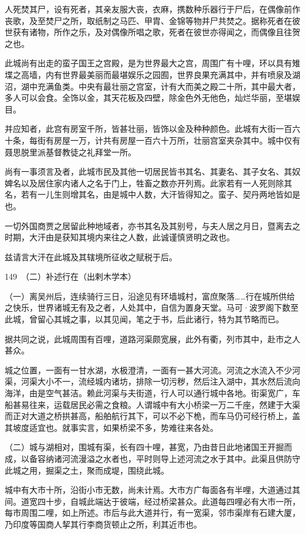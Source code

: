 \documentclass[12pt,UTF8]{ctexbook}
\begin{document}
人死焚其尸，设有死者，其亲友服大丧，衣麻，携数种乐器行于尸后，在偶像前作丧歌，及至焚尸之所，取纸制之马匹、甲胄、金锦等物并尸共焚之。据称死者在彼世获有诸物，所作之乐，及对偶像所唱之歌，死者在彼世亦得闻之，而偶像且往贺之也。

此城尚有出走的蛮子国王之宫殿，是为世界最大之宫，周围广有十哩，环以具有雉堞之高墙，内有世界最美丽而最堪娱乐之园囿，世界良果充满其中，并有喷泉及湖沼，湖中充满鱼类。中央有最壮丽之宫室，计有大而美之殿二十所，其中最大者，多人可以会食。全饰以金，其天花板及四壁，除金色外无他色，灿烂华丽，至堪娱目。

并应知者，此宫有房室千所，皆甚壮丽，皆饰以金及种种颜色。此城有大街一百六十条，每街有房屋一万，计共有房屋一百六十万所，壮丽宫室夹杂其中。城中仅有聂思脱里派基督教徒之礼拜堂一所。

尚有一事须言及者，此城市民及其他一切居民皆书其名、其妻名、其子女名、其奴婢名以及居住家内诸人之名于门上，牲畜之数亦开列焉。此家若有一人死则除其名，若有一儿生则增其名，由是城中人数，大汗皆得知之。蛮子、契丹两地皆如是也。

一切外国商贾之居留此种地域者，亦书其名及其别号，与夫人居之月日，暨离去之时期，大汗由是获知其境内来往之人数，此诚谨慎贤明之政也。

兹请言大汗在此城及其辖境所征收之赋税于后。





149　（二）补述行在（出剌木学本）

（一）离吴州后，连续骑行三日，沿途见有环墙城村，富庶聚落……行在城所供给之快乐，世界诸城无有及之者，人处其中，自信为置身天堂。马可·波罗阁下数至此城，曾留心其城之事，以其见闻，笔之于书，后此诸行，特为其节略而已。

据共同之说，此城周围有百哩，道路河渠颇宽展，此外有衢，列市其中，赴市之人甚众。

城之位置，一面有一甘水湖，水极澄清，一面有一甚大河流。河流之水流入不少河渠，河渠大小不一，流经城内诸坊，排除一切污秽，然后注入湖中，其水然后流向海洋，由是空气甚洁。赖此河渠与夫街道，行人可以通行城中各地。街渠宽广，车船甚易往来，运载居民必需之食粮。人谓城中有大小桥梁一万二千座，然建于大渠而正对大道之桥拱甚高，船舶航行其下，可以不必下桅，而车马仍可经行桥上，盖其坡度适宜也。就事实言，如果桥梁不多，势难往来各处。

（二）城与湖相对，围城有渠，长有四十哩，甚宽，乃由昔日此地诸国王开掘而成，以备容纳诸河流漫溢之水者也，平时则导上述河流之水于其中。此渠且供防守此城之用，掘渠之土，聚而成堤，围绕此城。

城中有大市十所，沿街小市无数，尚未计焉。大市方广每面各有半哩，大道通过其间。道宽四十步，自城此端达于彼端，经过桥梁甚众。此道每四哩必有大市一所，每市周围二哩，如上所述。市后与此大道并行，有一宽渠，邻市渠岸有石建大厦，乃印度等国商人挈其行李商货顿止之所，利其近市也。
\end{document}
